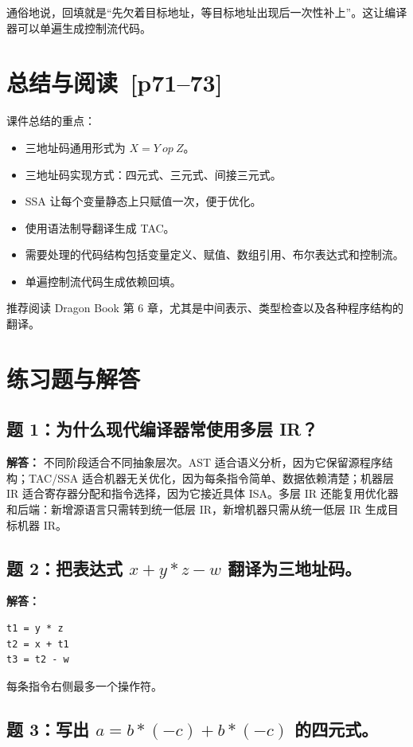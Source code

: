 \documentclass[UTF8,fontset=none,11pt]{ctexart}
\newcommand{\pg}[1]{\texorpdfstring{{\small\color{graytext}\,[p#1]}}{ [p#1]}}
\begin{document}
通俗地说，回填就是“先欠着目标地址，等目标地址出现后一次性补上”。这让编译器可以单遍生成控制流代码。

\section{总结与阅读 \pg{71--73}}

课件总结的重点：

\begin{itemize}
  \item 三地址码通用形式为 \(X=Y\ op\ Z\)。
  \item 三地址码实现方式：四元式、三元式、间接三元式。
  \item SSA 让每个变量静态上只赋值一次，便于优化。
  \item 使用语法制导翻译生成 TAC。
  \item 需要处理的代码结构包括变量定义、赋值、数组引用、布尔表达式和控制流。
  \item 单遍控制流代码生成依赖回填。
\end{itemize}

推荐阅读 Dragon Book 第 6 章，尤其是中间表示、类型检查以及各种程序结构的翻译。

\section{练习题与解答}

\subsection*{题 1：为什么现代编译器常使用多层 IR？}

\textbf{解答：} 不同阶段适合不同抽象层次。AST 适合语义分析，因为它保留源程序结构；TAC/SSA 适合机器无关优化，因为每条指令简单、数据依赖清楚；机器层 IR 适合寄存器分配和指令选择，因为它接近具体 ISA。多层 IR 还能复用优化器和后端：新增源语言只需转到统一低层 IR，新增机器只需从统一低层 IR 生成目标机器 IR。

\subsection*{题 2：把表达式 \texorpdfstring{\(x+y*z-w\)}{x+y*z-w} 翻译为三地址码。}

\textbf{解答：}
\begin{verbatim}
t1 = y * z
t2 = x + t1
t3 = t2 - w
\end{verbatim}
每条指令右侧最多一个操作符。

\subsection*{题 3：写出 \texorpdfstring{\(a=b*(-c)+b*(-c)\)}{a=b*(-c)+b*(-c)} 的四元式。}
\end{document}

